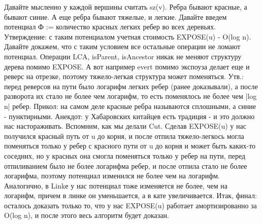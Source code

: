 Давайте мысленно у каждой вершины считать sz(v). Ребра бывают красные, а бывают синие. А еще ребра бывают тяжелые, и легкие. Давайте введем потенциал Ф := количество красных легких ребер во всех деревьях. Утверждение: с таким потенциалом учетная стоимость EXPOSE(u) - O(log n). Давайте докажем, что с таким условием все остальные операции не ломают потенциал. Операции LCA, isParent, isAncestor никак не меняют структуру дерева помимо EXPOSE. А вот например evert помимо экспоуза делает еще и реверс на отрезке, поэтому тяжело-легкая структура может поменяться. Утв.: перед реверсов на пути было логарифм легких ребер (ранее доказывали), а после разворота их стало не более чем логарифм, то есть поменялось не более чем |log n| ребер.
Прикол: на самом деле красные ребра называются сплошными, а синие - пунктирными.
Анекдот: у Хабаровских китайцев есть традиция - и это должно нас настораживать.
Вспомним, как мы делали Cut. Сделав EXPOSE(u) у нас получился красный путь от u до корня, и после отпила тяжело-легкось могла поменяться только у ребер с красного пути от u до корня и может быть каких-то соседних, но у красных она смогла поменяться только у ребер на пути, перед отпиливанием было не более логарифма ребер, и после отпила стало не более логарифма, поэтому потенциал изменился не более чем на логарифм. Аналогично, в Linkе у нас потенциал тоже изменяется не более, чем на логарифм, причем в линке он уменьшается, а в кате увеличивается. 
Итак, финал: осталось доказать только то, что у нас EXPOSE(u) работает амортизированно за O(log n), и после этого весь алгоритм будет доказан.

